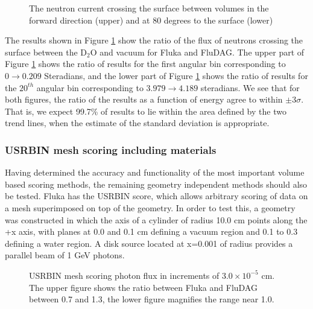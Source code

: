 \documentclass{anstrans}[12pt]
\begin{document}
\begin{figure}%
	\begin{center}
		\caption{The neutron current crossing the surface between volumes in the 
		forward direction (upper) and at 80 degrees to the surface (lower)}\label{fig:mat_usrbdx}
	\end{center}
\end{figure}

The results shown in Figure \ref{fig:mat_usrbdx} show the ratio of the
flux of neutrons crossing the surface between the D$_2$O and vacuum
for Fluka and FluDAG. The upper part of Figure \ref{fig:mat_usrbdx} shows
the ratio of results for the first angular bin corresponding to $0
\to 0.209$ Steradians, and the lower part of Figure \ref{fig:mat_usrbdx}
shows the ratio of results for the $20^{th}$ angular bin corresponding to $3.979
\to 4.189$ steradians. We see that for both figures, the ratio of the
results as a function of energy agree to within $\pm 3\sigma$. That is, we
expect 99.7\% of results to lie within the area defined by the two
trend lines, when the estimate of the standard deviation is appropriate.

\subsubsection*{USRBIN mesh scoring including materials}
Having determined the accuracy and functionality of the most important 
volume based scoring methods, the remaining geometry independent methods
should also be tested.
Fluka has the USRBIN score, which allows arbitrary scoring
of data on a mesh superimposed on top of the geometry. In order to test this, a geometry
was constructed in which the axis of a cylinder of radius 10.0 cm points along the
+x axis, with planes at 0.0 and 0.1 cm defining a vacuum region and 0.1 to 0.3 
defining a water region. A disk source located at x=0.001 of radius provides a 
parallel beam of 1 GeV photons.

\begin{figure}%
	\begin{center}
		\caption{USRBIN mesh scoring photon flux in increments
                  of $3.0 \times 10^{-5}$ cm. The upper figure shows the ratio between
                  Fluka and FluDAG between 0.7 and 1.3, the lower
                  figure magnifies the range near 1.0. }\label{fig:mesh_phot}
	\end{center}
\end{figure}
\end{document}

